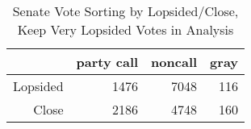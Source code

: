 \documentclass[12pt]{article}
\begin{document}
\begin{table}[ht]
	\centering
	\caption{Senate Vote Sorting by Lopsided/Close, Keep Very Lopsided Votes in Analysis}
	\begin{tabular}{rrrr}
		\hline
		& party call  & noncall & gray \\ 
		\hline
		Lopsided & 1476 & 7048 & 116 \\ 
		Close & 2186 & 4748 & 160 \\ 
		\hline
	\end{tabular}
\end{table}
\end{document}
